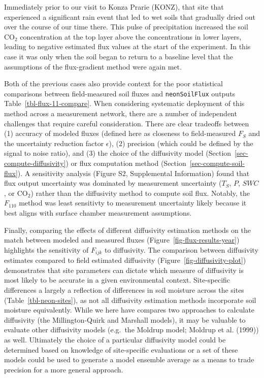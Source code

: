 \documentclass[
  letterpaper,
  DIV=11,
  numbers=noendperiod]{scrartcl}
\begin{document}
Immediately prior to our visit to Konza Prarie (KONZ), that site that
experienced a significant rain event that led to wet soils that
gradually dried out over the course of our time there. This pulse of
precipitation increased the soil CO\(_{2}\) concentration at the top
layer above the concentrations in lower layers, leading to negative
estimated flux values at the start of the experiment. In this case it
was only when the soil began to return to a baseline level that the
assumptions of the flux-gradient method were again met.

Both of the previous cases also provide context for the poor statistical
comparisons between field-measured soil fluxes and \texttt{neonSoilFlux}
outputs Table~\ref{tbl-flux-11-compare}. When considering systematic
deployment of this method across a measurement network, there are a
number of independent challenges that require careful consideration.
There are clear tradeoffs between (1) accuracy of modeled fluxes
(defined here as closeness to field-measured \(F_{S}\) and the
uncertainty reduction factor \(\epsilon\)), (2) precision (which could
be defined by the signal to noise ratio), and (3) the choice of the
diffusivity model (Section~\ref{sec-compute-diffusivity}) or flux
computation method (Section~\ref{sec-compute-soil-flux}). A sensitivity
analysis (Figure S2, Supplemental Information) found that flux output
uncertainty was dominated by measurement uncertainty (\(T_{S}\), \(P\),
\(SWC\), or CO\(_{2}\)) rather than the diffusivity method to compute
soil flux. Notably, the \(F_{110}\) method was least sensitivty to
measurement uncertainty likely because it best aligns with surface
chamber measurement assumptions.

Finally, comparing the effects of different diffusivity estimation
methods on the match between modeled and measured fluxes
(Figure~\ref{fig-flux-results-year}) highlights the sensitivity of
\(F_{ijk}\) to diffusivity. The comparison between diffusivity estimates
compared to field estimated diffusivity
(Figure~\ref{fig-diffusivity-plot}) demonstrates that site parameters
can dictate which measure of diffusivity is most likely to be accurate
in a given environmental context. Site-specific differences a largely a
reflection of differences in soil moisture across the sites
(Table~\ref{tbl-neon-sites}), as not all diffusivity estimation methods
incorporate soil moisture equivalently. While we here have compares two
approaches to calculate diffusivity (the Millington-Quirk and Marshall
models), it may be valuable to evaluate other diffusivity models
(e.g.~the Moldrup model; Moldrup et al. (1999)) as well. Ultimately the
choice of a particular diffusivity model could be determined based on
knowledge of site-specific evaluations or a set of these models could be
used to generate a model ensemble average as a means to trade precision
for a more general approach.
\end{document}

